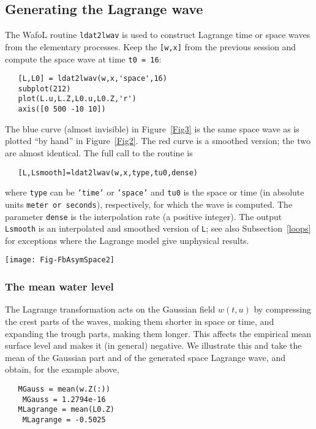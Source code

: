 \subsection{Generating the Lagrange wave}
The {\sc WafoL} routine {\tt ldat2lwav} is used to construct Lagrange time or space waves from the elementary 
processes. Keep the {\tt [w,x]} from the previous session and compute the space wave at time {\tt t0 = 16}:
{\small\begin{verbatim}
   [L,L0] = ldat2lwav(w,x,'space',16)
   subplot(212)
   plot(L.u,L.Z,L0.u,L0.Z,'r')
   axis([0 500 -10 10])
\end{verbatim}
}
The blue curve (almost invisible) in Figure~\ref{Fig3} is the same space wave as is plotted ``by hand'' in 
Figure~\ref{Fig2}. The red curve is a smoothed version; the two are almost identical.
The full call to the routine is
{\small\begin{verbatim}
   [L,Lsmooth]=ldat2lwav(w,x,type,tu0,dense)
\end{verbatim}
}
\noindent where {\tt type} can be {\tt 'time'} or {\tt 'space'} and {\tt tu0} is the space or time (in absolute units 
{\tt meter or seconds}), respectively, for which the wave is computed. The parameter {\tt dense} is the 
interpolation rate (a positive integer).
The output {\tt Lsmooth} is an interpolated and smoothed version of {\tt L}; see also Subsection~\ref{loops} for exceptions where the Lagrange model give unphysical results.

 \begin{SCfigure}[1][t]
\texttt{[image: Fig-FbAsymSpace2]}
\caption{Front-back symmetric Lagrange space wave on shallow water {\tt (h = 8 m)} generated by {\tt ldat2lwav}.}
\label{Fig3}
\end{SCfigure}

\subsubsection*{The mean water level}
The Lagrange transformation acts on the Gaussian field $w(t,u)$ by compressing the crest parts of the waves, 
making them shorter in space or time, and expanding the trough parts, making them longer. This affects the 
empirical mean surface level and makes it (in general) negative. We illustrate this and take the mean of the 
Gaussian part and of the generated space Lagrange wave, and obtain, for the example above,
{\small\begin{verbatim}
   MGauss = mean(w.Z(:))
	MGauss = 1.2794e-16
   MLagrange = mean(L0.Z)
	MLagrange = -0.5025
\end{verbatim}}


